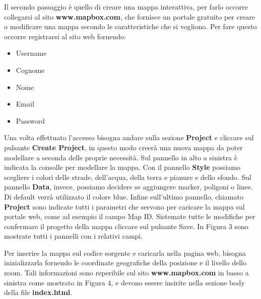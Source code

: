 \documentclass[a4paper,11pt]{article}
\newcommand{\tab}[1]{\hspace{.3\textwidth}\rlap{#1}}
\begin{document}
\begin{enumerate}
\begin{enumerate}
Il secondo passaggio è quello di creare una mappa interattiva, per farlo occorre collegarsi al sito \textbf{www.mapbox.com}, che fornisce un portale gratuito per creare o modificare una mappa secondo le caratteristiche che si vogliono.\newline
Per fare questo occorre registrarsi al sito web fornendo:
			\smallskip
			\begin{itemize}
				\item Username
				\item Cognome
				\item Nome
				\item Email
				\item Password
			\end{itemize}
			\smallskip
			\medskip
Una volta effettuato l'accesso bisogna andare sulla sezione \textbf{Project} e cliccare sul pulsante \textbf{Create Project}, in questo modo creerà una nuova mappa da poter modellare a seconda delle proprie necessità.\newline
Sul pannello in alto a sinistra è indicata la consolle per modellare la mappa. Con il pannello \textbf{Style} possiamo scegliere i colori delle strade, dell'acqua, della terra e pianure e dello sfondo.\newline
Sul pannello \textbf{Data}, invece, possiamo decidere se aggiungere marker, poligoni o linee. Di default verrà utilizzato il colore blue.
Infine sull'ultimo pannello, chiamato \textbf{Project} sono indicate tutti i parametri che servono per caricare la mappa sul portale web, come ad esempio il campo Map ID.
Sistemate tutte le modifiche per confermare il progetto della mappa cliccare sul pulsante Save.\newline
In Figura 3 sono mostrate tutti i pannelli con i relativi campi.
			\newpage
			\begin{figure}[!ht]
			\end{figure}
			\tab{\textbf{Figura 3}}
				\newline				
			\medskip
			
Per inserire la mappa sul codice sorgente e caricarla nella pagina web, bisogna inizializzarla fornendo le coordinate geografiche della posizione e il livello dello zoom.
Tali informazioni sono reperibile sul sito \textbf{www.mapbox.com} in basso a sinistra come mostrato in Figura 4, e devono essere insirite nella sezione body della file \textbf{index.html}.
			\begin{figure}[!ht]
			\end{figure}
			

\end{enumerate}
\end{enumerate}
\end{document}
